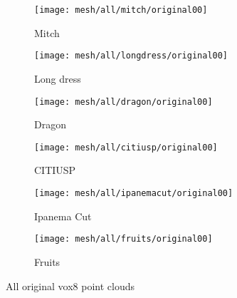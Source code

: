 \begin{figure}
    \centering
    \begin{subfigure}{0.3\textwidth}
        \centering
        \texttt{[image: mesh/all/mitch/original00]}
        \caption{Mitch}
        \label{fig:mitch}
    \end{subfigure}
    \begin{subfigure}{0.3\textwidth}
        \centering
        \texttt{[image: mesh/all/longdress/original00]}
        \caption{Long dress}
        \label{fig:longdress}
    \end{subfigure}
    \begin{subfigure}{0.3\textwidth}
        \centering
        \texttt{[image: mesh/all/dragon/original00]}
        \caption{Dragon}
        \label{fig:dragon}
    \end{subfigure}
    \begin{subfigure}{0.3\textwidth}
        \centering
        \texttt{[image: mesh/all/citiusp/original00]}
        \caption{CITIUSP}
        \label{fig:citiusp}
    \end{subfigure}
    \begin{subfigure}{0.3\textwidth}
        \centering
        \texttt{[image: mesh/all/ipanemacut/original00]}
        \caption{Ipanema Cut}
        \label{fig:ipanema-cut}
    \end{subfigure}
    \begin{subfigure}{0.3\textwidth}
        \centering
        \texttt{[image: mesh/all/fruits/original00]}
        \caption{Fruits}
        \label{fig:fruits}
    \end{subfigure}
    \caption{All original vox8 point clouds}
\end{figure}

